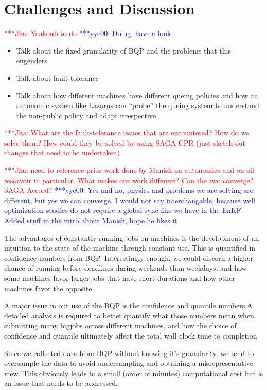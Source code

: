 \documentclass[conference,final]{IEEEtran}
\newcommand{\jhanote}[1]{ {\textcolor{red} { ***Jha: #1 }}}
\newcommand{\yyenote}[1]{ {\textcolor{blue} { ***yye00: #1 }}}
\newcommand{\jhanote}[1]{}
\newcommand{\yyenote}[1]{}
\begin{document}
\section{Challenges and Discussion}

\jhanote{Yaakoub to do}
\yyenote{Doing, have a look}

\begin{itemize}
\item Talk about the fixed granularity of BQP and the problems that this
engenders
\item Talk about fault-tolerance
\item Talk about how different machines have different queing policies
  and how an autonomic system like Lazarus can ``probe'' the queing
  system to understand the non-public policy and adapt irrespective.
\end{itemize}


\jhanote{What are the fault-tolerance issues that are encountered?
  How do we solve them? How could they be solved by using SAGA-CPR
  (just sketch out changes that need to be undertaken)}

\jhanote{need to reference prior work done by Manish on autonomics and
  on oil resorvoir in particular. What makes our work different?  Can
  the two converge? SAGA-Accord?}
\yyenote{Yes and no, physics and problems we are solving are different, 
but yes we can converge. I would not say interchangable, because well 
optimization studies do not require a global sync like we have in the EnKF
Added stuff in the intro about Manish, hope he likes it}  

The advantages of constantly running jobs on machines is the development
of an intuition to the state of the machine through constant use. This is
quantified in confidence numbers from BQP. Interestingly enough, we could
discern a higher chance of running before deadlines during weekends than
weekdays, and how some machines favor larger jobs that have short durations
and how other machines favor the opposite.

A major issue in our use of the BQP is the confidence and quantile numbers.A detailed
analysis is required to better quantify what those numbers mean when submitting
many bigjobs across different machines, and how the choice of confidence and quantile
ultimately affect the total wall clock time to completion.

Since we collected data from BQP without knowing it's granularity, we tend to
oversample the data to avoid undersampling and obtaining a misrepresentative view.
This obviously leads to a small (order of minutes) computational cost but is an issue
that needs to be addressed.
\end{document}
